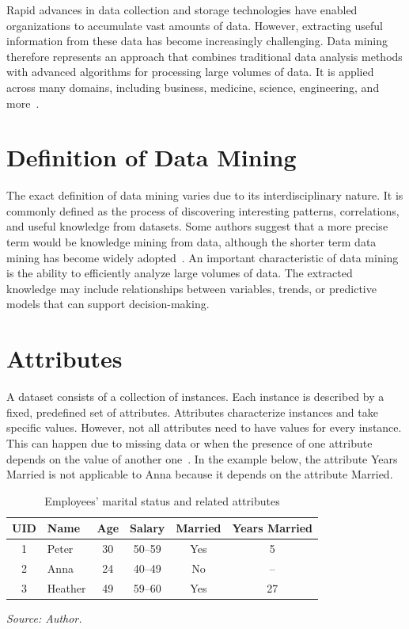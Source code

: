Rapid advances in data collection and storage technologies have enabled organizations to accumulate vast amounts of data. However, extracting useful information from these data has become increasingly challenging. Data mining therefore represents an approach that combines traditional data analysis methods with advanced algorithms for processing large volumes of data. It is applied across many domains, including business, medicine, science, engineering, and more~\parencite{Tan2014}.

\section{Definition of Data Mining}

The exact definition of data mining varies due to its interdisciplinary nature. It is commonly defined as the process of discovering interesting patterns, correlations, and useful knowledge from datasets. Some authors suggest that a more precise term would be knowledge mining from data, although the shorter term data mining has become widely adopted~\parencite{Han2012}. An important characteristic of data mining is the ability to efficiently analyze large volumes of data. The extracted knowledge may include relationships between variables, trends, or predictive models that can support decision-making.

\section{Attributes}

A dataset consists of a collection of instances. Each instance is described by a fixed, predefined set of attributes. Attributes characterize instances and take specific values. However, not all attributes need to have values for every instance. This can happen due to missing data or when the presence of one attribute depends on the value of another one~\parencite{Witten2020}. In the example below, the attribute Years Married is not applicable to Anna because it depends on the attribute Married. 

\begin{table}[h!]
\centering
\begin{threeparttable}
\caption{Employees' marital status and related attributes}
\label{tab:employees}
\begin{tabular}{c l c c c c}
\hline
UID & Name & Age & Salary & Married & Years Married \\
\hline
1 & Peter & 30 & 50--59 & Yes & 5 \\
2 & Anna & 24 & 40--49 & No & -- \\
3 & Heather & 49 & 59--60 & Yes & 27 \\
\hline
\end{tabular}
\begin{tablenotes}
\item \textit{Source: Author.}
\end{tablenotes}
\end{threeparttable}
\end{table}

